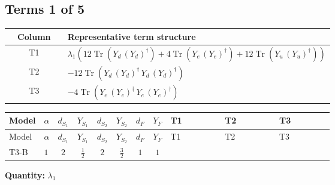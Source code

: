 \documentclass[8pt]{article}
\begin{document}
\begin{landscape}
\subsection*{Terms 1 of 5}
\begin{center}
\begin{tabular}{@{}c >{\raggedright\arraybackslash}p{0.82\linewidth}@{}}
\toprule
Column & Representative term structure \\
\midrule
T1 & \(\displaystyle {\lambda_1} (12 \operatorname{Tr}\!\left({Y_d}\,\left({Y_d}\right)^{\dagger}\right)+4 \operatorname{Tr}\!\left({Y_e}\,\left({Y_e}\right)^{\dagger}\right)+12 \operatorname{Tr}\!\left({Y_u}\,\left({Y_u}\right)^{\dagger}\right))\) \\
\midrule
T2 & \(\displaystyle -12 \operatorname{Tr}\!\left({Y_d}\,\left({Y_d}\right)^{\dagger}\,{Y_d}\,\left({Y_d}\right)^{\dagger}\right)\) \\
\midrule
T3 & \(\displaystyle -4 \operatorname{Tr}\!\left({Y_e}\,\left({Y_e}\right)^{\dagger}\,{Y_e}\,\left({Y_e}\right)^{\dagger}\right)\) \\
\midrule
\bottomrule
\end{tabular}
\end{center}
\smallskip
\tiny
\begin{longtable}{@{}llcccccc >{\raggedright\arraybackslash}p{0.21\linewidth} >{\raggedright\arraybackslash}p{0.21\linewidth} >{\raggedright\arraybackslash}p{0.21\linewidth}@{}}
\toprule
Model & $\alpha$ & $d_{S_1}$ & $Y_{S_1}$ & $d_{S_2}$ & $Y_{S_2}$ & $d_F$ & $Y_F$ & T1 & T2 & T3 \\
\midrule
\endfirsthead
\toprule
Model & $\alpha$ & $d_{S_1}$ & $Y_{S_1}$ & $d_{S_2}$ & $Y_{S_2}$ & $d_F$ & $Y_F$ & T1 & T2 & T3 \\
\midrule
\endhead
T3-B & $1$ & $2$ & $\frac{1}{2}$ & $2$ & $\frac{3}{2}$ & $1$ & $1$ & \scriptsize\adjustbox{max width=\linewidth}{$\begin{gathered} {\lambda_1} (12 \operatorname{Tr}\!\left({Y_d}\,\left({Y_d}\right)^{\dagger}\right)+4 \operatorname{Tr}\!\left({Y_e}\,\left({Y_e}\right)^{\dagger}\right)+12 \operatorname{Tr}\!\left({Y_u}\,\left({Y_u}\right)^{\dagger}\right))\end{gathered}$} & \scriptsize\adjustbox{max width=\linewidth}{$\begin{gathered} -12 \operatorname{Tr}\!\left({Y_d}\,\left({Y_d}\right)^{\dagger}\,{Y_d}\,\left({Y_d}\right)^{\dagger}\right)\end{gathered}$} & \scriptsize\adjustbox{max width=\linewidth}{$\begin{gathered} -4 \operatorname{Tr}\!\left({Y_e}\,\left({Y_e}\right)^{\dagger}\,{Y_e}\,\left({Y_e}\right)^{\dagger}\right)\end{gathered}$} \\
\midrule
\bottomrule
\end{longtable}
\clearpage
\noindent\textbf{Quantity: }$\lambda_1$\par\smallskip

\end{landscape}
\end{document}
